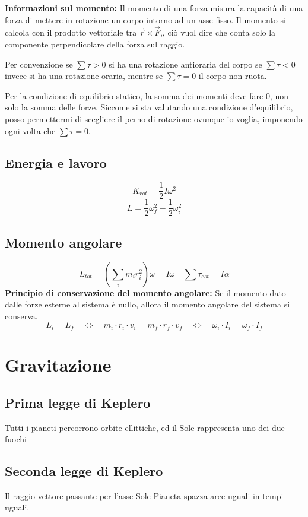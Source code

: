 \documentclass[a4paper]{article}
\theoremstyle{break}
\theoremstyle{break}
\theoremstyle{break}
\theoremstyle{break}
\begin{document}
\noindent \textbf{Informazioni sul momento: }
\noindent Il momento di una forza misura la capacità di una forza di mettere in rotazione un corpo intorno ad
un asse fisso. Il momento si calcola con il prodotto vettoriale tra \( \vec{r} \times \vec{F} \),,
ciò vuol dire che conta solo la componente perpendicolare della forza sul raggio.

\vspace{1em}
\noindent Per convenzione se \( \sum \tau > 0 \) si ha una rotazione antioraria del corpo
se \( \sum \tau < 0 \) invece si ha una
rotazione oraria, mentre se \( \sum \tau = 0 \) il corpo non ruota.

\vspace{1em}
\noindent Per la condizione di equilibrio statico, la somma dei momenti deve fare 0, non solo la somma delle
forze. Siccome si sta valutando una condizione d’equilibrio, posso permettermi di scegliere il perno
di rotazione ovunque io voglia, imponendo ogni volta che \( \sum \tau = 0 \).

\subsection{Energia e lavoro}
\[
  K_{rot} = \frac{1}{2} I \omega^2
\] 
\[
  L = \frac{1}{2} \omega_f^2 - \frac{1}{2} \omega_i^2
\] 

\subsection{Momento angolare}
\[
  L_{tot} = \left( \sum_i m_i r_i^2 \right) \omega = I \omega \quad \sum \tau_{est} = I \alpha
\] 
\textbf{Principio di conservazione del momento angolare:}
\noindent Se il momento dato dalle forze esterne al sistema è nullo, allora il momento angolare del sistema si
conserva.
\[
L_i = L_f \quad \iff \quad m_i \cdot r_i \cdot v_i = m_f \cdot r_f \cdot v_f \quad \iff \quad \omega_i \cdot I_i = \omega_f \cdot I_f
\] 

\section{Gravitazione}
\subsection{Prima legge di Keplero}
Tutti i pianeti percorrono orbite ellittiche, ed il Sole rappresenta uno dei due fuochi

\subsection{Seconda legge di Keplero}
Il raggio vettore passante per l’asse Sole-Pianeta spazza aree uguali in tempi uguali.
\end{document}
